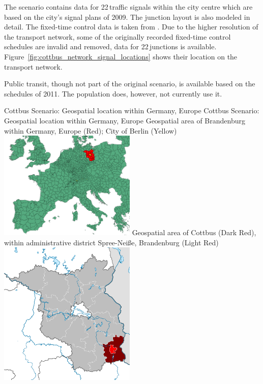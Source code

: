 The scenario contains data for 22\,traffic signals within the city centre which are based on the city's signal plans of 2009. 
The junction layout is also modeled in detail.
The fixed-time control data is taken from \citet{KoehlerStrehler2010SignalDemandOptimization}.  
Due to the higher resolution of the transport network, some of the originally recorded fixed-time control schedules are invalid and removed, data for 22\,junctions is available. 
Figure~\ref{fig:cottbus_network_signal_locations} shows their location on the transport network.  

Public transit, though not part of the original scenario, is available based on the schedules of 2011. The population does, however, not currently use it.

\createfigure%
{Cottbus Scenario: Geospatial location within Germany, Europe}%
{Cottbus Scenario: Geospatial location within Germany, Europe}%
{\label{fig:scenarios:cottbus_location}}%
{%
  \createsubfigure%
	{Geospatial area of Brandenburg within Germany, Europe (Red); City of Berlin (Yellow)}
	{\includegraphics[width=0.49\textwidth]{./using/figures/brandenburg_europe.png}}
	{\label{fig:scenarios:cottbus_brandenburg_europe}}
  \createsubfigure%
	{Geospatial area of Cottbus (Dark Red), within administrative district Spree-Neiße, Brandenburg (Light Red)}
	{\includegraphics[width=0.49\textwidth]{./using/figures/brandenburg_spree_neise_cottbus.pdf}}
	{\label{fig:scenarios:cottbus_bb}}
}%
{\citet{Grether2014PhD}}

